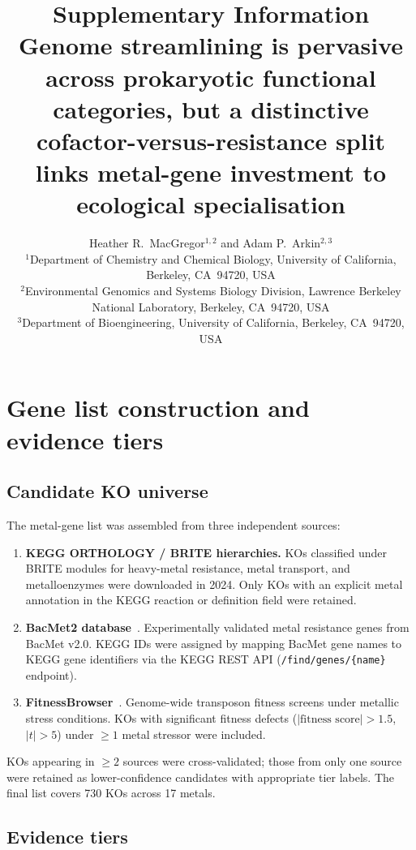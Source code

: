 \documentclass[11pt]{article}
\title{\textbf{Supplementary Information}\\[6pt]
\large Genome streamlining is pervasive across prokaryotic functional categories,
but a distinctive cofactor-versus-resistance split links metal-gene investment
to ecological specialisation}
\author{Heather R.\ MacGregor$^{1,2}$ and Adam P.\ Arkin$^{2,3}$\\[4pt]
\small $^1$Department of Chemistry and Chemical Biology, University of California,
Berkeley, CA~94720, USA\\
\small $^2$Environmental Genomics and Systems Biology Division,
Lawrence Berkeley National Laboratory, Berkeley, CA~94720, USA\\
\small $^3$Department of Bioengineering, University of California,
Berkeley, CA~94720, USA}
\date{}
\begin{document}
\maketitle
\tableofcontents

\clearpage
\section{Gene list construction and evidence tiers}
\label{sm:genelist}

\subsection{Candidate KO universe}

The metal-gene list was assembled from three independent sources:

\begin{enumerate}
\item \textbf{KEGG ORTHOLOGY / BRITE hierarchies.} KOs classified under BRITE
  modules for heavy-metal resistance, metal transport, and metalloenzymes were
  downloaded in 2024.  Only KOs with an explicit metal annotation in the KEGG
  reaction or definition field were retained.

\item \textbf{BacMet2 database}~\cite{pal2014}.  Experimentally validated
  metal resistance genes from BacMet v2.0.  KEGG IDs were assigned by mapping
  BacMet gene names to KEGG gene identifiers via the KEGG REST API
  (\texttt{/find/genes/\{name\}} endpoint).

\item \textbf{FitnessBrowser}~\cite{price2018}.  Genome-wide transposon
  fitness screens under metallic stress conditions.  KOs with significant
  fitness defects ($|\text{fitness score}| > 1.5$, $|t| > 5$) under $\geq 1$
  metal stressor were included.
\end{enumerate}

KOs appearing in $\geq 2$ sources were cross-validated; those from only one
source were retained as lower-confidence candidates with appropriate tier labels.
The final list covers 730 KOs across 17 metals.

\subsection{Evidence tiers}
\end{document}

